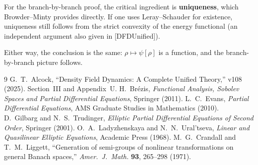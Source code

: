 \documentclass[aps,prd,twocolumn,superscriptaddress,nofootinbib]{revtex4-2}
\begin{document}
For the branch-by-branch proof, the critical ingredient is \textbf{uniqueness},
which Browder--Minty provides directly. If one uses Leray--Schauder for
existence, uniqueness still follows from the strict convexity of the energy
functional (an independent argument also given in [DFDUnified]).

Either way, the conclusion is the same: $\rho \mapsto \psi[\rho]$ is a
function, and the branch-by-branch picture follows.

\begin{thebibliography}{9}
 G.~T.~Alcock, ``Density Field Dynamics: A Complete
Unified Theory,'' v108 (2025). Section~III and Appendix~U.
 H.~Br\'ezis, \textit{Functional Analysis, Sobolev Spaces
and Partial Differential Equations}, Springer (2011).
 L.~C.~Evans, \textit{Partial Differential Equations},
AMS Graduate Studies in Mathematics (2010).
 D.~Gilbarg and N.~S.~Trudinger,
\textit{Elliptic Partial Differential Equations of Second Order},
Springer (2001).
 O.~A.~Ladyzhenskaya and N.~N.~Ural'tseva,
\textit{Linear and Quasilinear Elliptic Equations}, Academic Press (1968).
 M.~G.~Crandall and T.~M.~Liggett,
``Generation of semi-groups of nonlinear transformations on general
Banach spaces,'' \textit{Amer.~J.~Math.} \textbf{93}, 265--298 (1971).
\end{thebibliography}
\end{document}
